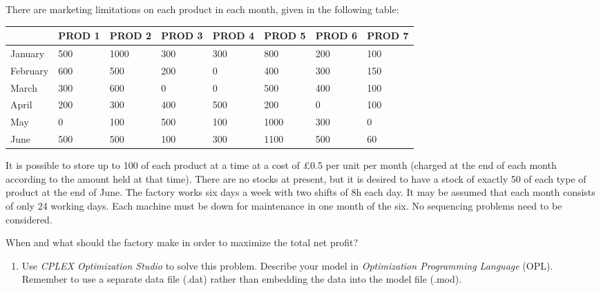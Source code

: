 \documentclass[12pt,a4paper]{article}
\theoremstyle{definition}
\begin{document}
\begin{enumerate}
    There are marketing limitations on each product in each month, given in the following table:

    \begin{table}[htbp]
      \scriptsize
      \centering
      \renewcommand\arraystretch{1.1}
      \begin{tabular}{m{} m{}<{\centering} m{}<{\centering} m{}<{\centering} m{}<{\centering} m{}<{\centering} m{}<{\centering} m{}<{\centering}}
      \hline
       & \textbf{PROD 1} & \textbf{PROD 2} & \textbf{PROD 3} & \textbf{PROD 4} & \textbf{PROD 5} & \textbf{PROD 6} &  \textbf{PROD 7} \\\hline
      January & 500 & 1000 & 300 & 300 & 800 & 200 & 100 \\
      February & 600 & 500 & 200 & 0 & 400 & 300 & 150 \\
      March & 300 & 600 & 0 & 0 & 500 & 400 & 100 \\
      April & 200 & 300 & 400 & 500 & 200 & 0 & 100 \\
      May & 0 & 100 & 500 & 100 & 1000 & 300 & 0 \\
      June & 500 & 500 & 100 & 300 & 1100 & 500 & 60 \\
      \hline
      \end{tabular}
    \end{table}

    It is possible to store up to 100 of each product at a time at a cost of \pounds0.5 per unit per month (charged at the end of each month according to the amount held at that time). There are no stocks at present, but it is desired to have a stock of exactly 50 of each type of product at the end of June. The factory works six days a week with two shifts of 8h each day. It may be assumed that each month consists of only 24 working days. Each machine must be down for maintenance in one month of the six. No sequencing problems need to be considered.

    When and what should the factory make in order to maximize the total net profit?

    \begin{enumerate}
    \item
    Use \emph{CPLEX Optimization Studio} to solve this problem. Describe your model in \emph{Optimization Programming Language} (OPL). Remember to use a separate data file (.dat) rather than embedding the data into the model file (.mod).


\end{enumerate}
\end{enumerate}
\end{document}
